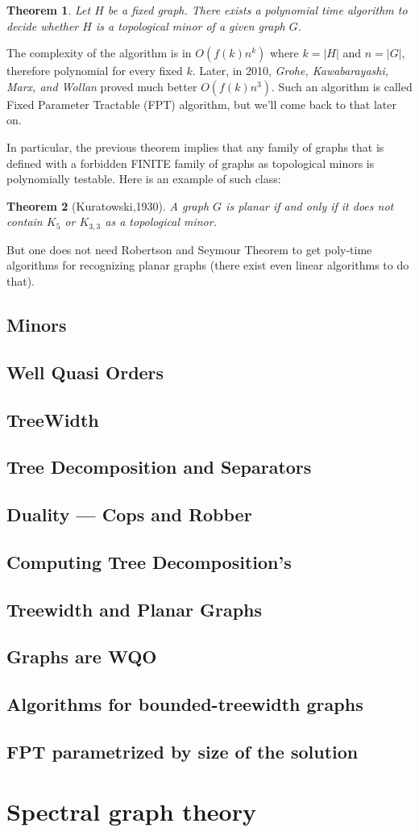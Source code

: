 \documentclass[12pt,a4paper]{article}
\newtheorem{theorem}{Theorem}
\begin{document}
\begin{theorem}
  Let $H$ be a fixed graph.  There exists a polynomial time algorithm to decide
  whether $H$ is a topological minor of a given graph $G$.
\end{theorem}

The complexity of the algorithm is in $O(f(k)n^k)$ where $k=|H|$ and $n=|G|$,
therefore polynomial for every fixed $k$. Later, in 2010, \textit{Grohe,
  Kawabarayashi, Marx, and Wollan} proved much better $O(f(k)n^3)$.  Such an
algorithm is called Fixed Parameter Tractable (FPT) algorithm, but we'll come
back to that later on.

In particular, the previous theorem implies that any family of graphs that is
defined with a forbidden FINITE family of graphs as topological minors is
polynomially testable.  Here is an example of such class:

\begin{theorem}[Kuratowski,1930]
  A graph $G$ is planar if and only if it does not contain $K_5$ or $K_{3,3}$ as
  a topological minor.
\end{theorem}

But one does not need Robertson and Seymour Theorem to get poly-time algorithms
for recognizing planar graphs (there exist even linear algorithms to do that).

\subsection{Minors}
\subsection{Well Quasi Orders}
\subsection{TreeWidth}
\subsection{Tree Decomposition and Separators}
\subsection{Duality --- Cops and Robber}
\subsection{Computing Tree Decomposition's}
\subsection{Treewidth and Planar Graphs}
\subsection{Graphs are WQO}
\subsection{Algorithms for bounded-treewidth graphs}
\subsection{FPT parametrized by size of the solution}

\section{Spectral graph theory}
\end{document}
